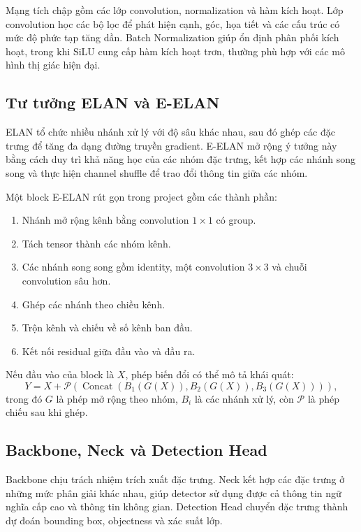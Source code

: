 \documentclass[12pt,a4paper]{article}
\begin{document}
Mạng tích chập gồm các lớp convolution, normalization và hàm kích hoạt. Lớp convolution học các bộ lọc để phát hiện cạnh, góc, họa tiết và các cấu trúc có mức độ phức tạp tăng dần. Batch Normalization giúp ổn định phân phối kích hoạt, trong khi SiLU cung cấp hàm kích hoạt trơn, thường phù hợp với các mô hình thị giác hiện đại.

\subsection{Tư tưởng ELAN và E-ELAN}

ELAN tổ chức nhiều nhánh xử lý với độ sâu khác nhau, sau đó ghép các đặc trưng để tăng đa dạng đường truyền gradient. E-ELAN mở rộng ý tưởng này bằng cách duy trì khả năng học của các nhóm đặc trưng, kết hợp các nhánh song song và thực hiện channel shuffle để trao đổi thông tin giữa các nhóm.

Một block E-ELAN rút gọn trong project gồm các thành phần:
\begin{enumerate}[leftmargin=*]
  \item Nhánh mở rộng kênh bằng convolution $1\times1$ có group.
  \item Tách tensor thành các nhóm kênh.
  \item Các nhánh song song gồm identity, một convolution $3\times3$ và chuỗi convolution sâu hơn.
  \item Ghép các nhánh theo chiều kênh.
  \item Trộn kênh và chiếu về số kênh ban đầu.
  \item Kết nối residual giữa đầu vào và đầu ra.
\end{enumerate}

Nếu đầu vào của block là $X$, phép biến đổi có thể mô tả khái quát:
\[
Y = X + \mathcal{P}\left(\operatorname{Concat}
    \left(B_1(G(X)),B_2(G(X)),B_3(G(X))\right)\right),
\]
trong đó $G$ là phép mở rộng theo nhóm, $B_i$ là các nhánh xử lý, còn $\mathcal{P}$ là phép chiếu sau khi ghép.

\subsection{Backbone, Neck và Detection Head}

Backbone chịu trách nhiệm trích xuất đặc trưng. Neck kết hợp các đặc trưng ở những mức phân giải khác nhau, giúp detector sử dụng được cả thông tin ngữ nghĩa cấp cao và thông tin không gian. Detection Head chuyển đặc trưng thành dự đoán bounding box, objectness và xác suất lớp.
\end{document}
